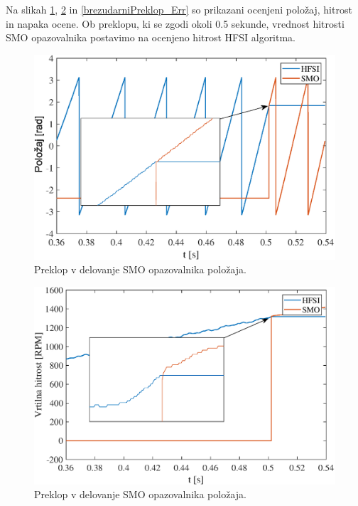 \documentclass[a4paper,twoside,openright,12pt,slovene]{book}
\begin{document}
Na slikah \ref{brezudarniPreklop_Pos}, \ref{brezudarniPreklop_Speed} in \ref{brezudarniPreklop_Err} so prikazani ocenjeni položaj, hitrost in napaka ocene. Ob preklopu, ki se zgodi okoli 0.5 sekunde,
vrednost hitrosti SMO opazovalnika postavimo na ocenjeno hitrost HFSI algoritma.

\begin{figure}[!htbp]
    \centering
    \includegraphics[width=0.8\columnwidth]{Slike/brezudarniPreklop_Pos.eps}
    \caption{\label{brezudarniPreklop_Pos} Preklop v delovanje SMO opazovalnika položaja. }
\end{figure}

\begin{figure}[!htbp]
    \centering
    \includegraphics[width=0.8\columnwidth]{Slike/brezudarniPreklop_Speed.eps}
    \caption{\label{brezudarniPreklop_Speed} Preklop v delovanje SMO opazovalnika položaja. }
\end{figure}
\end{document}
